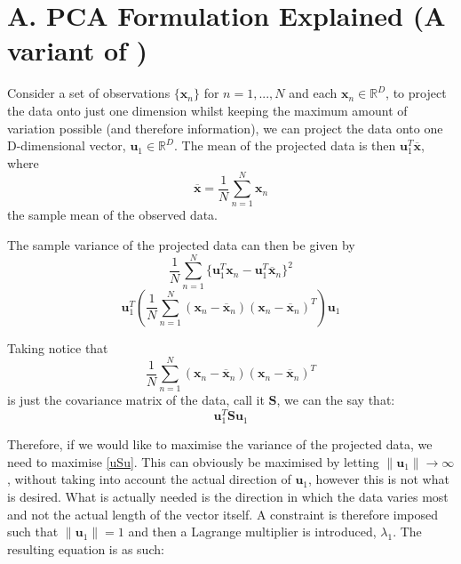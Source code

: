 \documentclass[11pt,a4paper]{article}
\begin{document}
\section*{A. PCA Formulation Explained (A variant of \cite{bishop})}

Consider a set of observations $\{\mathbf{x}_n\}$ for $n = 1, ..., N$ and each $\mathbf{x}_n \in \mathbb{R}^D$, to project the data onto just one dimension whilst keeping the maximum amount of variation possible (and therefore information), we can project the data onto one D-dimensional vector, $\mathbf{u}_1 \in \mathbb{R}^D$. The mean of the projected data is then $\mathbf{u}_1^T \mathbf{\overline{x}}$, where
\begin{equation*}
\mathbf{\overline{x}} = \frac{1}{N} \sum_{n = 1}^N \mathbf{x}_n 
\end{equation*} 
the sample mean of the observed data.

The sample variance of the projected data can then be given by
\begin{equation*}
\frac{1}{N} \sum_{n = 1}^N \{\mathbf{u}_1^T\mathbf{x}_n -  \mathbf{u}_1^T\mathbf{\overline{x}}_n\}^2
\end{equation*} 
\begin{equation*}
\mathbf{u}_1^T \left( \frac{1}{N} \sum_{n = 1}^N \left(\mathbf{x}_n - \mathbf{\overline{x}}_n\right)\left(\mathbf{x}_n - \mathbf{\overline{x}}_n\right)^T \right) \mathbf{u}_1
\end{equation*} 

Taking notice that 
\begin{equation*}
\frac{1}{N} \sum_{n = 1}^N \left(\mathbf{x}_n - \mathbf{\overline{x}}_n\right)\left(\mathbf{x}_n - \mathbf{\overline{x}}_n\right)^T 
\end{equation*} 
is just the covariance matrix of the data, call it $\mathbf{S}$, we can the say that:
\begin{equation}
\mathbf{u}_1^T \mathbf{S} \mathbf{u}_1
\label{uSu}
\end{equation} 

Therefore, if we would like to maximise the variance of the projected data, we need to maximise \eqref{uSu}. This can obviously be maximised by letting $\|\mathbf{u}_1\| \to \infty$, without taking into account the actual direction of $\mathbf{u}_1$, however this is not what is desired. What is actually needed is the direction in which the data varies most and not the actual length of the vector itself. A constraint is therefore imposed such that $\|\mathbf{u}_1\| = 1$ and then a Lagrange multiplier is introduced, $\lambda_1$. The resulting equation is as such:
\end{document}
